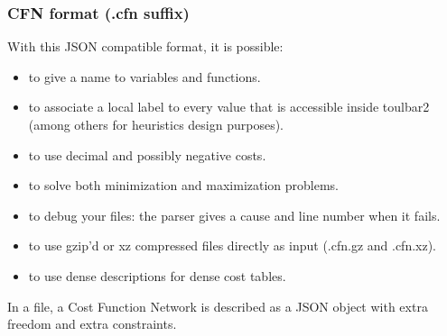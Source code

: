 \documentclass[letterpaper,10pt,openany,oneside,english]{sphinxmanual}
\begin{document}
\subsubsection{CFN format (.cfn suffix)}
\label{\detokenize{formats/cfnformat:cfn-format-cfn-suffix}}\label{\detokenize{formats/cfnformat:cfn-format}}\label{\detokenize{formats/cfnformat::doc}}
\sphinxAtStartPar
With this JSON compatible format, it is possible:
\begin{itemize}
\item {} 
\sphinxAtStartPar
to give a name to variables and functions.

\item {} 
\sphinxAtStartPar
to associate a local label to every value that is accessible inside toulbar2 (among others for heuristics design purposes).

\item {} 
\sphinxAtStartPar
to use decimal and possibly negative costs.

\item {} 
\sphinxAtStartPar
to solve both minimization and maximization problems.

\item {} 
\sphinxAtStartPar
to debug your  files: the parser gives a cause and line number when it fails.

\item {} 
\sphinxAtStartPar
to use gzip’d or xz compressed files directly as input (.cfn.gz and .cfn.xz).

\item {} 
\sphinxAtStartPar
to use dense descriptions for dense cost tables.

\end{itemize}

\sphinxAtStartPar
In a  file, a Cost Function Network is described as a JSON object with extra freedom and extra constraints.
\end{document}
